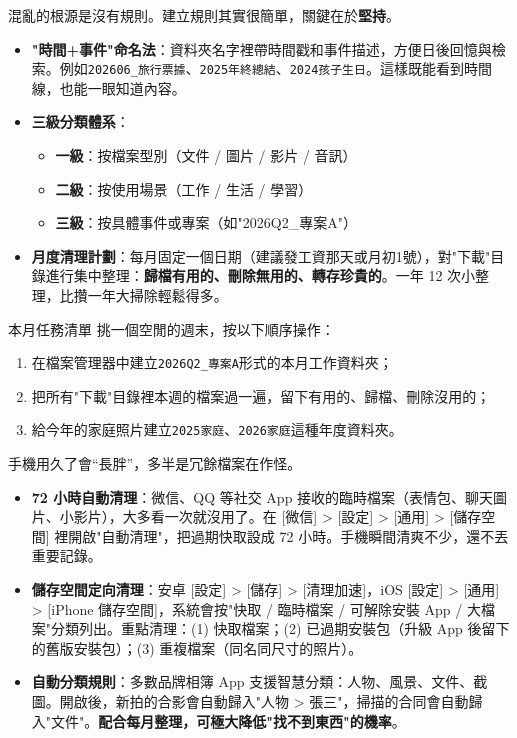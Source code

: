 
混亂的根源是沒有規則。建立規則其實很簡單，關鍵在於\textbf{堅持}。

\begin{itemize}
  \item \textbf{"時間+事件"命名法}：資料夾名字裡帶時間戳和事件描述，方便日後回憶與檢索。例如\texttt{202606\_旅行票據}、\texttt{2025年終總結}、\texttt{2024孩子生日}。這樣既能看到時間線，也能一眼知道內容。
  \item \textbf{三級分類體系}：
  \begin{itemize}
    \item \textbf{一級}：按檔案型別（文件 / 圖片 / 影片 / 音訊）
    \item \textbf{二級}：按使用場景（工作 / 生活 / 學習）
    \item \textbf{三級}：按具體事件或專案（如"2026Q2\_專案A"）
  \end{itemize}
  \item \textbf{月度清理計劃}：每月固定一個日期（建議發工資那天或月初1號），對"下載"目錄進行集中整理：\textbf{歸檔有用的、刪除無用的、轉存珍貴的}。一年 12 次小整理，比攢一年大掃除輕鬆得多。
\end{itemize}

\begin{tcbpractice}{本月任務清單}
挑一個空閒的週末，按以下順序操作：

\begin{enumerate}
  \item 在檔案管理器中建立\texttt{2026Q2\_專案A}形式的本月工作資料夾；
  \item 把所有"下載"目錄裡本週的檔案過一遍，留下有用的、歸檔、刪除沒用的；
  \item 給今年的家庭照片建立\texttt{2025家庭}、\texttt{2026家庭}這種年度資料夾。
\end{enumerate}

\end{tcbpractice}


手機用久了會“長胖”，多半是冗餘檔案在作怪。

\begin{itemize}
  \item \textbf{72 小時自動清理}：微信、QQ 等社交 App 接收的臨時檔案（表情包、聊天圖片、小影片），大多看一次就沒用了。在 [微信] > [設定] > [通用] > [儲存空間] 裡開啟"自動清理"，把過期快取設成 72 小時。手機瞬間清爽不少，還不丟重要記錄。
  \item \textbf{儲存空間定向清理}：安卓 [設定] > [儲存] > [清理加速]，iOS [設定] > [通用] > [iPhone 儲存空間]，系統會按"快取 / 臨時檔案 / 可解除安裝 App / 大檔案"分類列出。重點清理：(1) 快取檔案；(2) 已過期安裝包（升級 App 後留下的舊版安裝包）；(3) 重複檔案（同名同尺寸的照片）。
  \item \textbf{自動分類規則}：多數品牌相簿 App 支援智慧分類：人物、風景、文件、截圖。開啟後，新拍的合影會自動歸入"人物 > 張三"，掃描的合同會自動歸入"文件"。\textbf{配合每月整理，可極大降低"找不到東西"的機率}。
\end{itemize}

